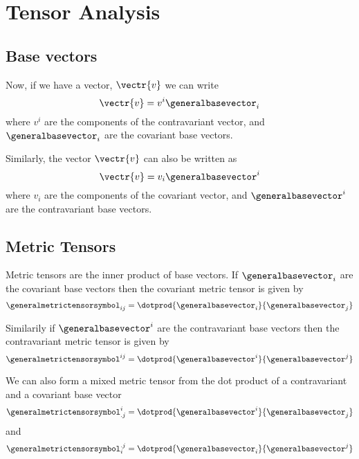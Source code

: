 \section{Tensor Analysis}
\subsection{Base vectors}

Now, if we have a vector, $\vectr{v}$ we can write
\begin{equation}
  \vectr{v}=v^{i}\generalbasevector_{i}
\end{equation}
where $v^{i}$ are the components of the contravariant vector, and
$\generalbasevector_{i}$ are the covariant base vectors.

Similarly, the vector $\vectr{v}$ can also be written as 
\begin{equation}
  \vectr{v}=v_{i}\generalbasevector^{i}
\end{equation}
where $v_{i}$ are the components of the covariant vector, and
$\generalbasevector^{i}$ are the contravariant base vectors. 

\subsection{Metric Tensors}
\label{sec:metric tensors}

Metric tensors are the inner product of base vectors. If $\generalbasevector_{i}$ are the
covariant base vectors then the covariant metric tensor is given by
\begin{equation}
  \generalmetrictensorsymbol_{ij}=\dotprod{\generalbasevector_{i}}{\generalbasevector_{j}}
\end{equation}

Similarily if $\generalbasevector^{i}$ are the contravariant base vectors then the
contravariant metric tensor is given by 
\begin{equation}
  \generalmetrictensorsymbol^{ij}=\dotprod{\generalbasevector^{i}}{\generalbasevector^{j}}
\end{equation}

We can also form a mixed metric tensor from the dot product of a contravariant
and a covariant base vector \ie
\begin{equation}
  \generalmetrictensorsymbol^{i}_{.j}=\dotprod{\generalbasevector^{i}}{\generalbasevector_{j}}
\end{equation}
and 
\begin{equation}
  \generalmetrictensorsymbol_{i}^{.j}=\dotprod{\generalbasevector_{i}}{\generalbasevector^{j}}
\end{equation}

